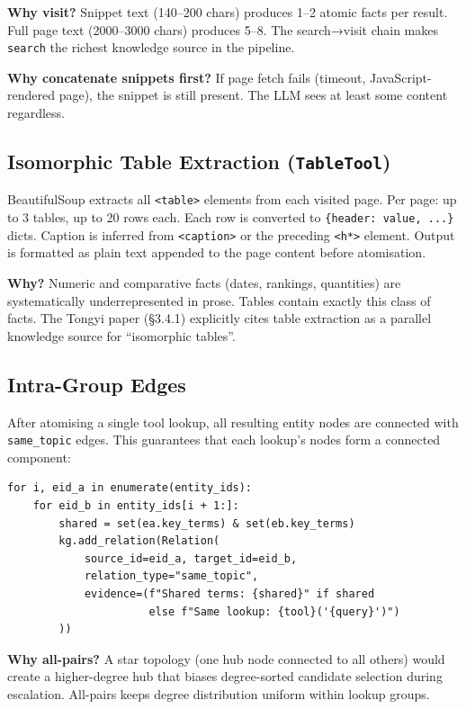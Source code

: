 \documentclass[11pt,a4paper]{article}
\begin{document}
\textbf{Why visit?} Snippet text (140--200 chars) produces 1--2 atomic facts per result. Full page text (2000--3000 chars) produces 5--8. The search→visit chain makes \texttt{search} the richest knowledge source in the pipeline.

\textbf{Why concatenate snippets first?} If page fetch fails (timeout, JavaScript-rendered page), the snippet is still present. The LLM sees at least some content regardless.

\subsection{Isomorphic Table Extraction (\texttt{TableTool})}

BeautifulSoup extracts all \texttt{<table>} elements from each visited page. Per page: up to 3 tables, up to 20 rows each. Each row is converted to \texttt{\{header: value, ...\}} dicts. Caption is inferred from \texttt{<caption>} or the preceding \texttt{<h*>} element. Output is formatted as plain text appended to the page content before atomisation.

\textbf{Why?} Numeric and comparative facts (dates, rankings, quantities) are systematically underrepresented in prose. Tables contain exactly this class of facts. The Tongyi paper (§3.4.1) explicitly cites table extraction as a parallel knowledge source for ``isomorphic tables''.

\subsection{Intra-Group Edges}

After atomising a single tool lookup, all resulting entity nodes are connected with \texttt{same\_topic} edges. This guarantees that each lookup's nodes form a connected component:

\begin{lstlisting}[style=py]
for i, eid_a in enumerate(entity_ids):
    for eid_b in entity_ids[i + 1:]:
        shared = set(ea.key_terms) & set(eb.key_terms)
        kg.add_relation(Relation(
            source_id=eid_a, target_id=eid_b,
            relation_type="same_topic",
            evidence=(f"Shared terms: {shared}" if shared
                      else f"Same lookup: {tool}('{query}')")
        ))
\end{lstlisting}

\textbf{Why all-pairs?} A star topology (one hub node connected to all others) would create a higher-degree hub that biases degree-sorted candidate selection during escalation. All-pairs keeps degree distribution uniform within lookup groups.
\end{document}
